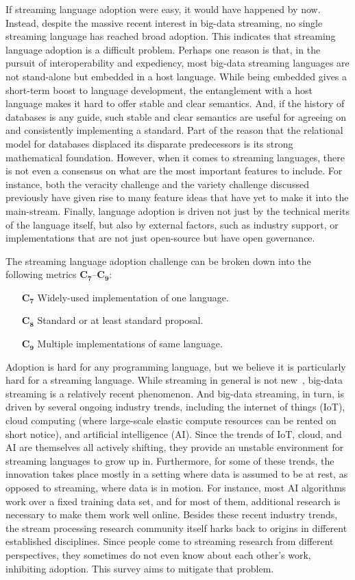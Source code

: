 If streaming language adoption were easy, it would have happened by
now. Instead, despite the massive recent interest in big-data
streaming, no single streaming language has reached broad adoption.
This indicates that streaming language adoption is a difficult
problem. Perhaps one reason is that, in the pursuit of
interoperability and expediency, most big-data streaming languages are
not stand-alone but embedded in a host language. While being embedded
gives a short-term boost to language development, the entanglement
with a host language makes it hard to offer stable and clear
semantics. And, if the history of databases is any guide, such stable
and clear semantics are useful for agreeing on and consistently
implementing a standard. Part of the reason that the relational model
for databases displaced its disparate predecessors is its strong
mathematical foundation. However, when it comes to streaming
languages, there is not even a consensus on what are the most
important features to include. For instance, both the veracity
challenge and the variety challenge discussed previously have given
rise to many feature ideas that have yet to make it into the
main-stream. Finally, language adoption is driven not just by the
technical merits of the language itself, but also by external factors,
such as industry support, or implementations that are not just
open-source but have open governance.

The streaming language adoption challenge can be broken down into the
following metrics $\mathbf{C_7}$--$\mathbf{C_9}$:
\begin{itemize}
  \item[$\mathbf{C_7}$] Widely-used implementation of one language.
  \item[$\mathbf{C_8}$] Standard or at least standard proposal.
  \item[$\mathbf{C_9}$] Multiple implementations of same language.
\end{itemize}

Adoption is hard for any programming language, but we believe it is
particularly hard for a streaming language. While streaming in general
is not new~\cite{stephens_1997}, big-data streaming is a relatively
recent phenomenon. And big-data streaming, in turn, is driven by
several ongoing industry trends, including the internet of things
(IoT), cloud computing (where large-scale elastic compute resources
can be rented on short notice), and artificial intelligence
(AI). Since the trends of IoT, cloud, and AI are themselves all
actively shifting, they provide an unstable environment for streaming
languages to grow up in. Furthermore, for some of these trends, the
innovation takes place mostly in a setting where data is assumed to be
at rest, as opposed to streaming, where data is in motion. For
instance, most AI algorithms work over a fixed training data set, and
for most of them, additional research is necessary to make them work
well online. Besides these recent industry trends, the stream
processing research community itself harks back to origins in
different established disciplines.  Since people come to streaming
research from different perspectives, they sometimes do not even know
about each other's work, inhibiting adoption. This survey aims to
mitigate that problem.
